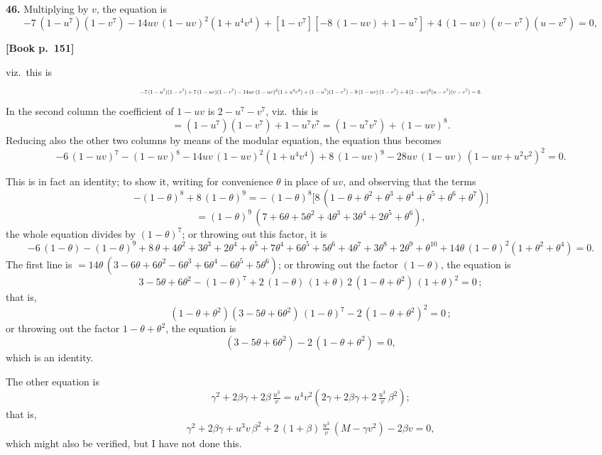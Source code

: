 \documentclass[11pt]{article}
\begin{document}
\medskip

\textbf{46.} Multiplying by $v$, the equation is
\[
-7\,(1 - u^7)(1 - v^7) - 14uv\,(1 - uv)^2(1 + u^4 v^4) + [1 - v^7][-8\,(1 - uv) + 1 - u^7] + 4\,(1 - uv)(v - v^7)(u - v^7) = 0,
\]

\bigskip

\noindent\textbf{[Book p.~151]}

\medskip

\noindent
viz.\ this is
\[
\resizebox{\textwidth}{!}{$\displaystyle
-7\,(1 - u^7)(1 - v^7) + 7\,(1 - uv)(1 - v^7) - 14uv\,(1 - uv)^2(1 + u^4 v^4)
+ (1 - u^7)(1 - v^7) - 8\,(1 - uv)\,(1 - v^7) + 4\,(1 - uv)^2(u - v^7)(v - v^7) = 0.
$}\]
In the second column the coefficient of $1 - uv$ is $2 - u^7 - v^7$, viz.\ this is
\[
= (1 - u^7)(1 - v^7) + 1 - u^7 v^7 = (1 - u^7 v^7) + (1 - uv)^8.
\]
Reducing also the other two columns by means of the modular equation, the equation
thus becomes
\[
-6\,(1 - uv)^7 - (1 - uv)^8 - 14uv\,(1 - uv)^2(1 + u^4 v^4)
+ 8\,(1 - uv)^9 - 28 uv\,(1 - uv)\,(1 - uv + u^2 v^2)^2 = 0.
\]

This is in fact an identity; to show it, writing for convenience $\theta$ in place of $uv$,
and observing that the terms
\[
-(1 - \theta)^8 + 8\,(1 - \theta)^9
= -\,(1 - \theta)^8\bigl[8\,(1 - \theta + \theta^2 + \theta^3 + \theta^4 + \theta^5 + \theta^6 + \theta^7)\bigr]
\]
\[
= (1 - \theta)^9\,(7 + 6\theta + 5\theta^2 + 4\theta^3 + 3\theta^4 + 2\theta^5 + \theta^6),
\]
the whole equation divides by $(1 - \theta)^7$; or throwing out this factor, it is
\[
-6\,(1 - \theta) - (1 - \theta)^9 + 8\,\theta + 4\theta^2 + 3\theta^3 + 2\theta^4 + \theta^5 + 7\theta^4 + 6\theta^5 + 5\theta^6 + 4\theta^7 + 3\theta^8 + 2\theta^9 + \theta^{10} + 14\theta\,(1 - \theta)^2(1+\theta^2 + \theta^4) = 0.
\]
The first line is $= 14\theta\,(3 - 6\theta + 6\theta^2 - 6\theta^3 + 6\theta^4 - 6\theta^5 + 5\theta^6)$; or throwing out the factor $(1 - \theta)$, the equation is
\[
3 - 5\theta + 6\theta^2 - (1 - \theta)^7 + 2\,(1 - \theta)\,(1 + \theta)\,2\,(1 - \theta + \theta^2)\,(1 + \theta)^2 = 0\,;
\]
that is,
\[
(1 - \theta + \theta^2)(3 - 5\theta + 6\theta^2)\,(1 - \theta)^7 - 2\,(1 - \theta + \theta^2)^2 = 0\,;
\]
or throwing out the factor $1 - \theta + \theta^2$, the equation is
\[
(3 - 5\theta + 6\theta^2) - 2\,(1 - \theta + \theta^2) = 0,
\]
which is an identity.

The other equation is
\[
\gamma^2 + 2\beta\gamma + 2\beta\,\tfrac{u^3}{v} = u^4 v^2\!\left(2\gamma + 2\beta\gamma + 2\,\tfrac{u^3}{v}\,\beta^2\right);
\]
that is,
\[
\gamma^2 + 2\beta\gamma + u^3 v\,\beta^2 + 2\,(1 + \beta)\,\tfrac{u^3}{v}\,(M - \gamma v^2) - 2\beta v = 0,
\]
which might also be verified, but I have not done this.
\end{document}
